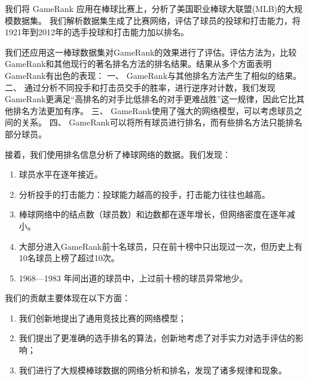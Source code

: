我们将 GameRank 应用在棒球比赛上，分析了美国职业棒球大联盟(MLB)的大规模数据集。
我们解析数据集生成了比赛网络，评估了球员的投球和打击能力，将1921年到2012年的选手投球和打击能力加以排名。

我们还应用这一棒球数据集对GameRank的效果进行了评估。评估方法为，比较GameRank和其他现行的著名排名方法的排名结果。结果从多个方面表明GameRank有出色的表现：
一、 GameRank与其他排名方法产生了相似的结果。 二、
通过分析不同投手和打击员交手的胜率，进行逆序对计数，我们发现GameRank更满足``高排名的对手比低排名的对手更难战胜''这一规律，因此它比其他排名方法更加有序。
三、 GameRank使用了强大的网络模型，可以考虑球员之间的关系。 四、
GameRank可以将所有球员进行排名，而有些排名方法只能排名部分球员。

接着，我们使用排名信息分析了棒球网络的数据。我们发现：

\begin{enumerate}
\item
  球员水平在逐年接近。
\item
  分析投手的打击能力：投球能力越高的投手，打击能力往往也越高。
\item
  棒球网络中的结点数（球员数）和边数都在逐年增长，但网络密度在逐年减小。
\item
  大部分进入GameRank前十名球员，只在前十榜中只出现过一次，但历史上有10名球员上榜了超过10次。
\item
  1968---1983 年间出道的球员中，上过前十榜的球员异常地少。
\end{enumerate}
\quad 我们的贡献主要体现在以下方面：

\begin{enumerate}
\item
  我们创新地提出了通用竞技比赛的网络模型；
\item
  我们提出了更准确的选手排名的算法，创新地考虑了对手实力对选手评估的影响；
\item
  我们进行了大规模棒球数据的网络分析和排名，发现了诸多规律和现象。
\end{enumerate}
